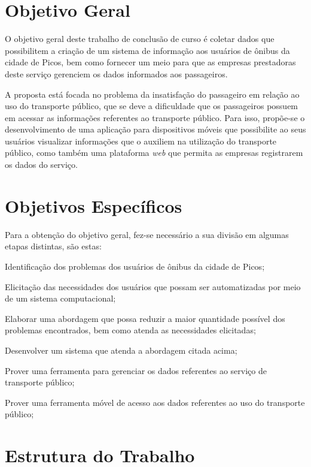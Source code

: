\section{Objetivo Geral}

O objetivo geral deste trabalho de conclusão de curso é coletar dados que possibilitem a criação de um sistema de informação aos usuários de ônibus da cidade de Picos, bem como fornecer um meio para que as empresas prestadoras deste serviço gerenciem os dados informados aos passageiros.

A proposta está focada no problema da insatisfação do passageiro em relação ao uso do transporte público, que se deve a dificuldade que os passageiros possuem em acessar as informações referentes ao transporte público. Para isso, propõe-se o desenvolvimento de uma aplicação para dispositivos móveis que possibilite ao seus usuários visualizar informações que o auxiliem na utilização do transporte público, como também uma plataforma \textit{web} que permita as empresas registrarem os dados do serviço.

\section{Objetivos Específicos}

Para a obtenção do objetivo geral, fez-se necessário a sua divisão em algumas etapas distintas, são estas:

\begin{lista}
\item Identificação dos problemas dos usuários de ônibus da cidade de Picos;
\item Elicitação das necessidades dos usuários que possam ser automatizadas por meio de um sistema computacional;
\item Elaborar uma abordagem que possa reduzir a maior quantidade possível dos problemas encontrados, bem como atenda as necessidades elicitadas;
\item Desenvolver um sistema que atenda a abordagem citada acima;
\item Prover uma ferramenta para gerenciar os dados referentes ao serviço de transporte público;
\item Prover uma ferramenta móvel de acesso aos dados referentes ao uso do transporte público;
\end{lista}

\section{Estrutura do Trabalho}

